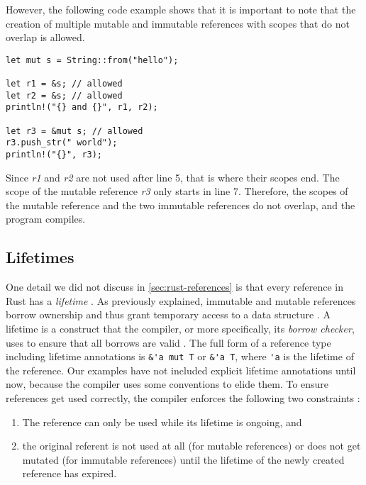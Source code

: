 \documentclass[sigplan,11pt,nonacm]{acmart}
\begin{document}
However, the following code example \cite{rust-book} shows that it is important to note that the creation of multiple mutable and immutable references with scopes that do not overlap is allowed.

\begin{lstlisting}
let mut s = String::from("hello");

let r1 = &s; // allowed
let r2 = &s; // allowed
println!("{} and {}", r1, r2);

let r3 = &mut s; // allowed
r3.push_str(" world");
println!("{}", r3);
\end{lstlisting}

Since \emph{r1} and \emph{r2} are not used after line 5, that is where their scopes end.
The scope of the mutable reference \emph{r3} only starts in line 7.
Therefore, the scopes of the mutable reference and the two immutable references do not overlap, and the program compiles.


\subsection{Lifetimes}


One detail we did not discuss in \ref{sec:rust-references} is that every reference in Rust has a \emph{lifetime} \cite{rust-book}.
As previously explained, immutable and mutable references borrow ownership and thus grant temporary access to a data structure \cite{understanding-evolving-rust}.
A lifetime is a construct that the compiler, or more specifically, its \emph{borrow checker}, uses to ensure that all borrows are valid \cite{rust-by-example}.
The full form of a reference type including lifetime annotations is \verb|&'a mut T| or \verb|&'a T|, where \verb|'a| is the lifetime of the reference.
Our examples have not included explicit lifetime annotations until now, because the compiler uses some conventions to elide them.
To ensure references get used correctly, the compiler enforces the following two constraints \cite{understanding-evolving-rust}:
\begin{enumerate}
  \item The reference can only be used while its lifetime is ongoing, and
  \item the original referent is not used at all (for mutable references) or does not get mutated (for immutable references) until the lifetime of the newly created reference has expired.
\end{enumerate}
\end{document}
